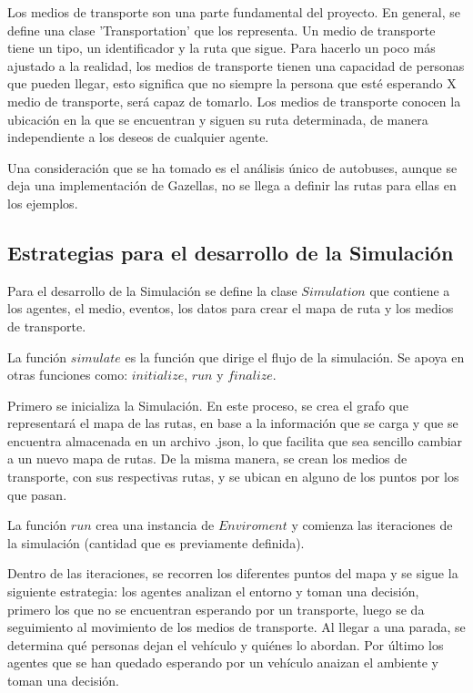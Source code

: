 \documentclass{article}
\begin{document}
Los medios de transporte son una parte fundamental del proyecto. En general, se define una clase 'Transportation' que los representa. Un medio de transporte tiene un tipo, un identificador y la ruta que sigue. Para hacerlo un poco más ajustado a la realidad, los medios de transporte tienen una capacidad de personas que pueden llegar, esto significa que no siempre la persona que esté esperando X medio de transporte, será capaz de tomarlo. Los medios de transporte conocen la ubicación en la que se encuentran y siguen su ruta determinada, de manera independiente a los deseos de cualquier agente. 

Una consideración que se ha tomado es el análisis único de autobuses, aunque se deja una implementación de Gazellas, no se llega a definir las rutas para ellas en los ejemplos. 

\subsection{Estrategias para el desarrollo de la Simulación}

Para el desarrollo de la Simulación se define la clase $Simulation$ que contiene a los agentes, el medio, eventos, los datos para crear el mapa de ruta y los medios de transporte.

La función $simulate$ es la función que dirige el flujo de la simulación. Se apoya en otras funciones como: $initialize$, $run$ y $finalize$.

Primero se inicializa la Simulación. En este proceso, se crea el grafo que representará el mapa de las rutas, en base a la información que se carga y que se encuentra almacenada en un archivo .json, lo que facilita que sea sencillo cambiar a un nuevo mapa de rutas. De la misma manera, se crean los medios de transporte, con sus respectivas rutas, y se ubican en alguno de los puntos por los que pasan.

La función $run$ crea una instancia de $Enviroment$ y comienza las iteraciones de la simulación (cantidad que es previamente definida).

Dentro de las iteraciones, se recorren los diferentes puntos del mapa y se sigue la siguiente estrategia: los agentes analizan el entorno y toman una decisión, primero los que no se encuentran esperando por un transporte, luego se da seguimiento al movimiento de los medios de transporte. Al llegar a una parada, se determina qué personas dejan el vehículo y quiénes lo abordan. Por último los agentes que se han quedado esperando por un vehículo anaizan el ambiente y toman una decisión. 
\end{document}
